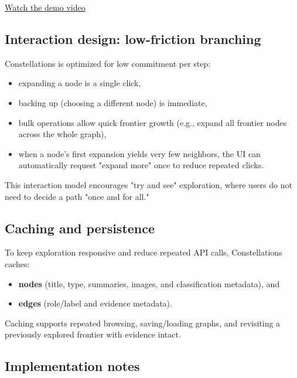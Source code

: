 \href{../../demo.mp4}{Watch the demo video}

\subsection{Interaction design: low-friction branching}

Constellations is optimized for low commitment per step:

\begin{itemize}[leftmargin=*]

\item expanding a node is a single click,

\item backing up (choosing a different node) is immediate,

\item bulk operations allow quick frontier growth (e.g., expand all frontier nodes across the whole graph),

\item when a node's first expansion yields very few neighbors, the UI can automatically request "expand more" once to reduce repeated clicks.

\end{itemize}

This interaction model encourages "try and see" exploration, where users do not need to decide a path "once and for all."

\subsection{Caching and persistence}

To keep exploration responsive and reduce repeated API calls, Constellations caches:

\begin{itemize}[leftmargin=*]

\item \textbf{nodes} (title, type, summaries, images, and classification metadata), and

\item \textbf{edges} (role/label and evidence metadata).

\end{itemize}

Caching supports repeated browsing, saving/loading graphs, and revisiting a previously explored frontier with evidence intact.

\subsection{Implementation notes}

